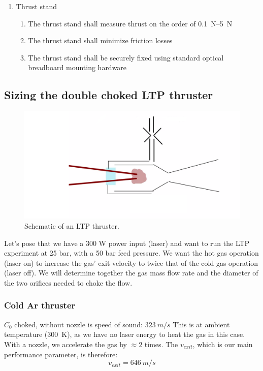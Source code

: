 \begin{enumerate}
\begin{enumerate}
                \end{enumerate}
                \item Thrust stand
                \begin{enumerate}
                    \item The thrust stand shall measure thrust on the order of \qtyrange{0.1}{5}{N}
                    \item The thrust stand shall minimize friction losses
                    \item The thrust stand shall be securely fixed using standard optical breadboard mounting hardware
                \end{enumerate}
            \end{enumerate}


        \subsection{Sizing the double choked LTP thruster}

            \begin{figure}[h]
            \centering
            \includegraphics[width=0.8\linewidth]{assets/3 design/double choked sizing.png}
            \caption{\label{fig:frog}Schematic of an LTP thruster.}
            \end{figure}
            
            Let's pose that we have a 300 W power input (laser) and want to run the LTP experiment at 25 bar, with a 50 bar feed pressure. We want the hot gas operation (laser on) to increase the gas' exit velocity to twice that of the cold gas operation (laser off). We will determine together the gas mass flow rate and the diameter of the two orifices needed to choke the flow.
            
            \subsubsection{Cold Ar thruster}
            $C_0$ choked, without nozzle is speed of sound: $323 \:m/s$ This is at ambient temperature (\qty{300}{K}), as we have no laser energy to heat the gas in this case. With a nozzle, we accelerate the gas by $\approx 2$ times. The $v_{exit}$, which is our main performance parameter, is therefore: 
            \[v_{exit} = 646\: m/s\]
            
